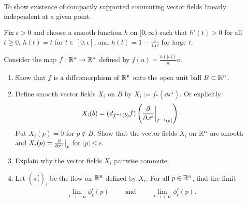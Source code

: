 \documentclass[11pt, english]{article}
\begin{document}
\begin{exc}
To show existence of compactly supported commuting vector fields linearly independent at a given point. 

Fix $\epsilon > 0$ and choose a smooth function $h$ on $[0,\infty)$ such that $h'(t) > 0$ for all $t\geq 0$, $h(t)=t$ for $t \in [0,\epsilon]$, and $h(t)=1-\frac{1}{\ln t}$ for large $t$. 

Consider the map $f:\mathbb{R}^n \to \mathbb{R}^n$ defined by $f(a)= \frac{h(\lvert a \rvert)}{\lvert a \rvert} a$. 
\begin{enumerate}
\item Show that $f$ is a diffeomorphism of $\mathbb{R}^n$ onto the open unit ball $B \subset \mathbb{R}^n$.

\item Define smooth vector fields $X_i$ on $B$ by $X_i := f_\ast(\dd{}{x^i})$. Or explicitly:
$$
X_i(b) = (d_{f^{-1}(b)}f)\left( \restr{\dd{}{x^i}}{f^{-1}(b)}\right).
$$
Put $X_i(p)=0$ for $p \not \in B$. Show that the vector fields $X_i$ on $\mathbb{R}^n$ are smooth and $X_i(p)=\restr{\dd{}{x^i}}{p}$ for $\lvert p \rvert \leq \epsilon$.

\item Explain why the vector fields $X_i$ pairwise commute.

\item Let $(\phi_t^i)_t$ be the flow on $\mathbb{R}^n$ defined by $X_i$. For all $p \in \mathbb{R}^n$, find the limit
\[
\lim_{t \to -\infty} \phi_t^i(p) \qquad \text{ and } \qquad \lim_{t \to +\infty} \phi_t^i(p).
\]

\end{enumerate}
\end{exc}
\end{document}
